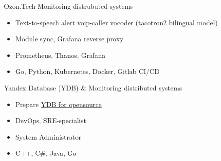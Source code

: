 \documentclass[10pt,a4paper,ragged2e]{altacv}
\begin{document}

\begin{fullwidth}
\makecvheader
\end{fullwidth}



Ozon.Tech Monitoring distrubuted systems
\begin{itemize}
    \item Text-to-speech alert voip-caller vocoder (tacotron2 bilingual model)
    \item Module sync, Grafana reverse proxy
    \item Prometheus, Thanos, Grafana
    \item Go, Python, Kubernetes, Docker, Gitlab CI/CD
\end{itemize}
\bigskip

Yandex Database (YDB) \& Monitoring distributed systems
\begin{itemize}
    \item Prepare \href{https://github.com/ydb-platform/ydb}{YDB for opensource}
    \item DevOps, SRE-specialist
    \item System Administrator
    \item C++, C\#, Java, Go
\end{itemize}
\bigskip
\end{document}
